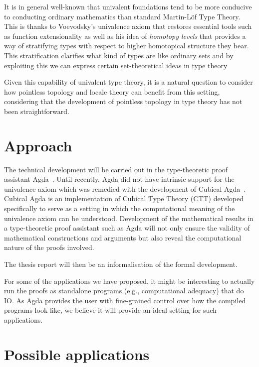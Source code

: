 \documentclass{article}
\begin{document}
It is in general well-known that univalent foundations tend to be more conducive to
conducting ordinary mathematics than standard Martin-L\"{o}f Type Theory. This is thanks
to Voevodsky's univalence axiom that restores essential tools such as function
extensionality as well as his idea of \emph{homotopy levels} that provides a way of
stratifying types with respect to higher homotopical structure they bear. This
stratification clarifies what kind of types are like ordinary sets and by exploiting this
we can express certain set-theoretical ideas in type theory~\cite[Chapter 10]{hottbook}

Given this capability of univalent type theory, it is a natural question to consider how
pointless topology and locale theory can benefit from this setting, considering that the
development of pointless topology in type theory has not been straightforward.

\section{Approach}\label{sec:approach}

The technical development will be carried out in the type-theoretic proof assistant
Agda~\cite{norell:2008}. Until recently, Agda did not have intrinsic support for the
univalence axiom which was remedied with the development of Cubical
Agda~\cite{cubicalagda}. Cubical Agda is an implementation of Cubical Type Theory (CTT)
developed specifically to serve as a setting in which the computational meaning of the
univalence axiom can be understood. Development of the mathematical results in a
type-theoretic proof assistant such as Agda will not only ensure the validity of
mathematical constructions and arguments but also reveal the computational nature of the
proofs involved.

The thesis report will then be an informalisation of the formal development.

For some of the applications we have proposed, it might be interesting to actually run the
proofs as standalone programs (e.g., computational adequacy) that do IO. As Agda provides
the user with fine-grained control over how the compiled programs look like, we believe it
will provide an ideal setting for such applications.

\section{Possible applications}\label{sec:applications}
\end{document}
